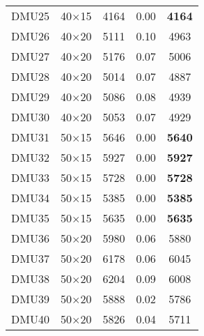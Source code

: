 \begin{table}[H]
\begin{tabular}{@{}ccccc@{}}
DMU25 & 40$\times$15 & 4164 & 0.00 & \textbf{4164}\\ 
DMU26 & 40$\times$20 & 5111 & 0.10 & 4963\\ 
DMU27 & 40$\times$20 & 5176 & 0.07 & 5006\\ 
DMU28 & 40$\times$20 & 5014 & 0.07 & 4887\\ 
DMU29 & 40$\times$20 & 5086 & 0.08 & 4939\\ 
DMU30 & 40$\times$20 & 5053 & 0.07 & 4929\\ 
DMU31 & 50$\times$15 & 5646 & 0.00 & \textbf{5640}\\ 
DMU32 & 50$\times$15 & 5927 & 0.00 & \textbf{5927}\\ 
DMU33 & 50$\times$15 & 5728 & 0.00 & \textbf{5728}\\ 
DMU34 & 50$\times$15 & 5385 & 0.00 & \textbf{5385}\\ 
DMU35 & 50$\times$15 & 5635 & 0.00 & \textbf{5635}\\ 
DMU36 & 50$\times$20 & 5980 & 0.06 & 5880\\ 
DMU37 & 50$\times$20 & 6178 & 0.06 & 6045\\ 
DMU38 & 50$\times$20 & 6204 & 0.09 & 6008\\ 
DMU39 & 50$\times$20 & 5888 & 0.02 & 5786\\ 
DMU40 & 50$\times$20 & 5826 & 0.04 & 5711\\ \bottomrule
\end{tabular}
\end{table}

